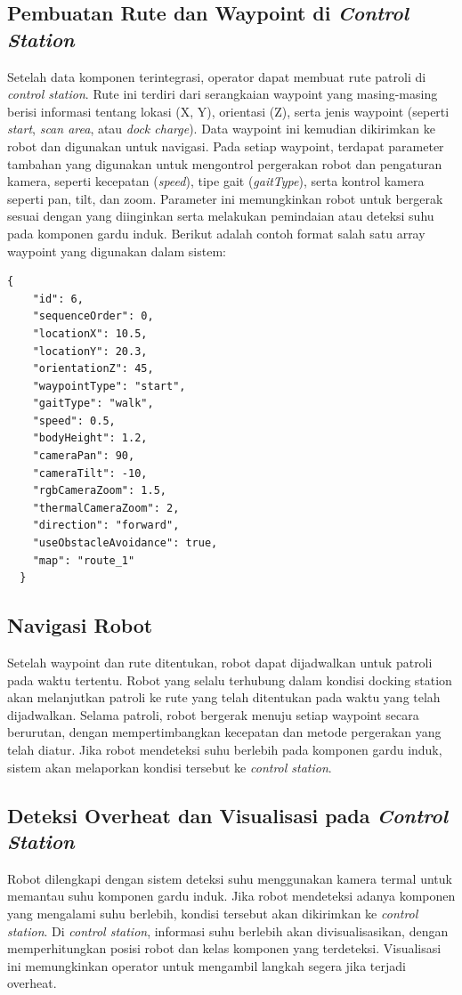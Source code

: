 \subsection{Pembuatan Rute dan Waypoint di \emph{Control Station}}
Setelah data komponen terintegrasi, operator dapat membuat rute patroli di \emph{control station}. Rute ini terdiri dari serangkaian waypoint yang masing-masing berisi informasi tentang lokasi (X, Y), orientasi (Z), serta jenis waypoint (seperti \emph{start}, \emph{scan area}, atau \emph{dock charge}). Data waypoint ini kemudian dikirimkan ke robot dan digunakan untuk navigasi. Pada setiap waypoint, terdapat parameter tambahan yang digunakan untuk mengontrol pergerakan robot dan pengaturan kamera, seperti kecepatan (\emph{speed}), tipe gait (\emph{gaitType}), serta kontrol kamera seperti pan, tilt, dan zoom. Parameter ini memungkinkan robot untuk bergerak sesuai dengan yang diinginkan serta melakukan pemindaian atau deteksi suhu pada komponen gardu induk. Berikut adalah contoh format salah satu array waypoint yang digunakan dalam sistem:

\begin{lstlisting}[language=XML, caption={Sample Waypoint JSON Data}, label={lst:waypoint-example}]
  {
    "id": 6,
    "sequenceOrder": 0,
    "locationX": 10.5,
    "locationY": 20.3,
    "orientationZ": 45,
    "waypointType": "start",
    "gaitType": "walk",
    "speed": 0.5,
    "bodyHeight": 1.2,
    "cameraPan": 90,
    "cameraTilt": -10,
    "rgbCameraZoom": 1.5,
    "thermalCameraZoom": 2,
    "direction": "forward",
    "useObstacleAvoidance": true,
    "map": "route_1"
  }
  \end{lstlisting}

\subsection{Navigasi Robot}
Setelah waypoint dan rute ditentukan, robot dapat dijadwalkan untuk patroli pada waktu tertentu. Robot yang selalu terhubung dalam kondisi docking station akan melanjutkan patroli ke rute yang telah ditentukan pada waktu yang telah dijadwalkan. Selama patroli, robot bergerak menuju setiap waypoint secara berurutan, dengan mempertimbangkan kecepatan dan metode pergerakan yang telah diatur. Jika robot mendeteksi suhu berlebih pada komponen gardu induk, sistem akan melaporkan kondisi tersebut ke \emph{control station}.

\subsection{Deteksi Overheat dan Visualisasi pada \emph{Control Station}}
Robot dilengkapi dengan sistem deteksi suhu menggunakan kamera termal untuk memantau suhu komponen gardu induk. Jika robot mendeteksi adanya komponen yang mengalami suhu berlebih, kondisi tersebut akan dikirimkan ke \emph{control station}. Di \emph{control station}, informasi suhu berlebih akan divisualisasikan, dengan memperhitungkan posisi robot dan kelas komponen yang terdeteksi. Visualisasi ini memungkinkan operator untuk mengambil langkah segera jika terjadi overheat.

